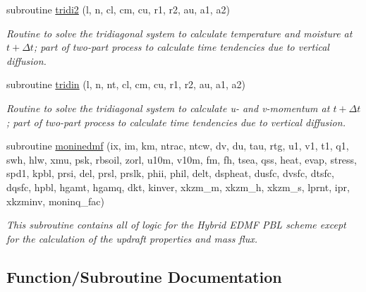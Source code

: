 \begin{DoxyCompactItemize}
\item 
subroutine \hyperlink{group___p_b_l_ga80bebdc639adaba3ed0ed2ea2f24315e}{tridi2} (l, n, cl, cm, cu, r1, r2, au, a1, a2)
\begin{DoxyCompactList}\small\item\em Routine to solve the tridiagonal system to calculate temperature and moisture at $ t + \Delta t $; part of two-\/part process to calculate time tendencies due to vertical diffusion. \end{DoxyCompactList}\item 
subroutine \hyperlink{group___p_b_l_gab77885fe7ace4ef00558157788778408}{tridin} (l, n, nt, cl, cm, cu, r1, r2, au, a1, a2)
\begin{DoxyCompactList}\small\item\em Routine to solve the tridiagonal system to calculate u-\/ and v-\/momentum at $ t + \Delta t $; part of two-\/part process to calculate time tendencies due to vertical diffusion. \end{DoxyCompactList}\end{DoxyCompactItemize}
\begin{DoxyCompactItemize}
\item 
subroutine \hyperlink{group___p_b_l_ga367b6dabfff601023af323f900db86d2}{moninedmf} (ix, im, km, ntrac, ntcw, dv, du, tau, rtg, u1, v1, t1, q1, swh, hlw, xmu, psk, rbsoil, zorl, u10m, v10m, fm, fh, tsea, qss, heat, evap, stress, spd1, kpbl, prsi, del, prsl, prslk, phii, phil, delt, dspheat, dusfc, dvsfc, dtsfc, dqsfc, hpbl, hgamt, hgamq, dkt, kinver, xkzm\+\_\+m, xkzm\+\_\+h, xkzm\+\_\+s, lprnt, ipr, xkzminv, moninq\+\_\+fac)
\begin{DoxyCompactList}\small\item\em This subroutine contains all of logic for the Hybrid E\+D\+MF P\+BL scheme except for the calculation of the updraft properties and mass flux. \end{DoxyCompactList}\end{DoxyCompactItemize}


\subsection{Function/\+Subroutine Documentation}
\mbox{\label{group___p_b_l_ga367b6dabfff601023af323f900db86d2}} 
